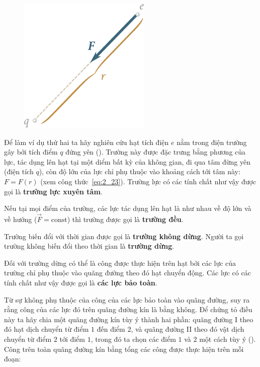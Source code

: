 \begin{figure}[!htb]
	\begin{center}
		\includegraphics[scale=1]{figures/ch_03/fig_3_4.pdf}
		\caption[]{}
		\label{fig:3_4}
	\end{center}
\end{figure}

Để làm ví dụ thứ hai ta hãy nghiên cứu hạt tích điện $e$ nằm trong điện trường gây bởi tích điểm $q$ đứng yên (). Trường này được đặc trưng bằng phương của lực, tác dụng lên hạt tại một diểm bất kỳ của không gian, đi qua tâm đừng yên (điện tích $q$), còn độ lớn của lực chỉ phụ thuộc vào khoảng cách tới tâm này: $F=F(r)$ (xem công thức~\eqref{eq:2_23}). Trường lực có các tính chất như vậy được gọi là \textbf{trường lực xuyên tâm}.

Nếu tại mọi điểm của trường, các lực tác dụng lên hạt là như nhau về độ lớn và về hướng ($\vec{F}=\text{const}$) thì trường được gọi là \textbf{trường đều}.

Trường biến đổi với thời gian được gọi là \textbf{trường không dừng}. Người ta gọi trường không biến đổi theo thời gian là \textbf{trường dừng}.

Đối với trường dừng có thể là công được thực hiện trên hạt bởi các lực của trường chỉ phụ thuộc vào quãng đường theo đó hạt chuyển động. Các lực có các tính chất như vậy được gọi là \textbf{các lực bảo toàn}.

Từ sự không phụ thuộc của công của các lực bảo toàn vào quãng đường, suy ra rằng công của các lực đó trên quãng đường kín là bằng không. Để chứng tỏ điều này ta hãy chia một quãng đường kín tùy ý thành hai phần: quãng đường I theo đó hạt dịch chuyển từ điểm $1$ đến điểm $2$, và quãng đường II theo đó vật dịch chuyển từ điểm $2$ tới điểm $1$, trong đó ta chọn các điểm $1$ và $2$ một cách tùy ý (). Công trên toàn quãng đường kín bằng tổng các công được thực hiện trên mỗi đoạn:

